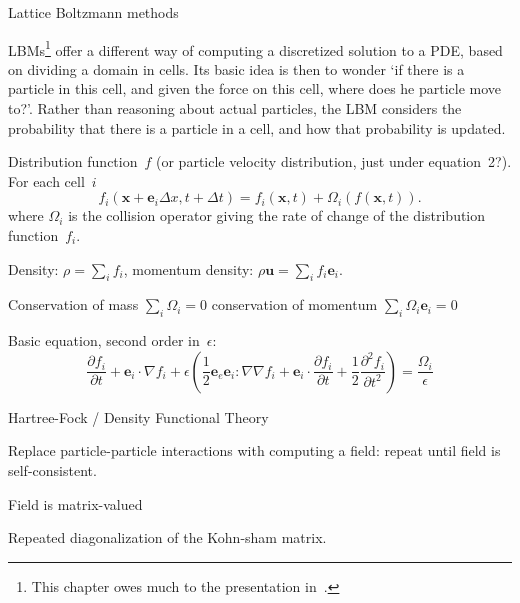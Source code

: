  {Lattice Boltzmann methods}

\acfp{LBM}\footnote{This chapter owes much to the presentation
  in~\cite{ChenDoolen:LBM}.}  offer a different way of computing a
discretized solution to a \ac{PDE}, based on dividing a domain in
cells. Its basic idea is then to wonder `if there is a particle in
this cell, and given the force on this cell, where does he particle
move to?'. Rather than reasoning about actual particles, the \ac{LBM}
considers the probability that there is a particle in a cell, and how
that probability is updated.

Distribution function~$f$ (or particle velocity distribution, just
under equation~2?).  For each cell~$i$
\[ f_i(\mathbf{x}+\mathbf{e}_i\Delta x,t+\Delta t) 
    = f_i(\mathbf{x},t)+\Omega_i(f(\mathbf{x},t)).
\]
where $\Omega_i$ is the collision operator giving
the rate of change of the distribution function~$f_i$.

Density: $\rho=\sum_i f_i$,
momentum density: $\rho\mathbf{u}=\sum_if_i\mathbf{e}_i$.

Conservation of mass $\sum_i\Omega_i=0$
conservation of momentum $\sum_i\Omega_i\mathbf{e}_i=0$


Basic equation, second order in~$\epsilon$:
\[
  \frac{\partial f_i}{\partial t} + \mathbf{e}_i\cdot \nabla f_i +
  \epsilon\left(
    \frac12 \mathbf{e}_e\mathbf{e}_i\colon \nabla\nabla f_i +
    \mathbf{e}_i\cdot\frac{\partial f_i}{\partial t} +
    \frac12 \frac{\partial^2f_i}{\partial t^2}
  \right) = \frac{\Omega_i}{\epsilon}
\]


 {Hartree-Fock / Density Functional Theory}

Replace particle-particle interactions with computing a field: 
repeat until field is self-consistent.

Field is matrix-valued

Repeated diagonalization of the Kohn-sham matrix.

